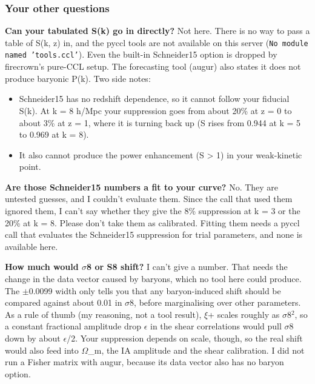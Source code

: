 \documentclass[11pt,a4paper]{article}
\begin{document}
\subsubsection*{Your other questions}
\textbf{Can your tabulated S(k) go in directly?} Not here. There is no way to pass a table of S(k, z) in, and the pyccl tools are not available on this server (\texttt{No module named 'tools.ccl'}). Even the built-in Schneider15 option is dropped by firecrown's pure-CCL setup. The forecasting tool (augur) also states it does not produce baryonic P(k). Two side notes:

\begin{itemize}
  \item Schneider15 has no redshift dependence, so it cannot follow your fiducial S(k). At k = 8 h/Mpc your suppression goes from about 20\% at z = 0 to about 3\% at z = 1, where it is turning back up (S rises from 0.944 at k = 5 to 0.969 at k = 8).
  \item It also cannot produce the power enhancement (S \textgreater{} 1) in your weak-kinetic point.
\end{itemize}
\textbf{Are those Schneider15 numbers a fit to your curve?} No. They are untested guesses, and I couldn't evaluate them. Since the call that used them ignored them, I can't say whether they give the 8\% suppression at k = 3 or the 20\% at k = 8. Please don't take them as calibrated. Fitting them needs a pyccl call that evaluates the Schneider15 suppression for trial parameters, and none is available here.

\textbf{How much would $\sigma$8 or S8 shift?} I can't give a number. That needs the change in the data vector caused by baryons, which no tool here could produce. The $\pm$0.0099 width only tells you that any baryon-induced shift should be compared against about 0.01 in $\sigma$8, before marginalising over other parameters. As a rule of thumb (my reasoning, not a tool result), $\xi$+ scales roughly as $\sigma$8$^2$, so a constant fractional amplitude drop $\epsilon$ in the shear correlations would pull $\sigma$8 down by about $\epsilon$/2. Your suppression depends on scale, though, so the real shift would also feed into $\Omega$\_m, the IA amplitude and the shear calibration. I did not run a Fisher matrix with augur, because its data vector also has no baryon option.
\end{document}
